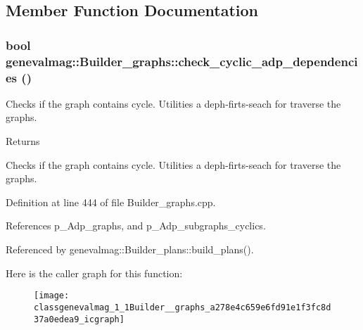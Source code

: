 \subsection{Member Function Documentation}
\hypertarget{classgenevalmag_1_1Builder__graphs_a278e4c659e6fd91e1f3fc8d37a0edea9}{
\subsubsection[{check\_\-cyclic\_\-adp\_\-dependencies}]{\setlength{\rightskip}{0pt plus 5cm}bool genevalmag::Builder\_\-graphs::check\_\-cyclic\_\-adp\_\-dependencies ()}}
\label{classgenevalmag_1_1Builder__graphs_a278e4c659e6fd91e1f3fc8d37a0edea9}
Checks if the graph contains cycle. Utilities a deph-\/firts-\/seach for traverse the graphs. \begin{DoxyReturn}{Returns}

\end{DoxyReturn}
Checks if the graph contains cycle. Utilities a deph-\/firts-\/seach for traverse the graphs. 

Definition at line 444 of file Builder\_\-graphs.cpp.



References p\_\-Adp\_\-graphs, and p\_\-Adp\_\-subgraphs\_\-cyclics.



Referenced by genevalmag::Builder\_\-plans::build\_\-plans().



Here is the caller graph for this function:\nopagebreak
\begin{figure}[H]
\begin{center}
\leavevmode
\texttt{[image: classgenevalmag\_1\_1Builder\_\_graphs\_a278e4c659e6fd91e1f3fc8d37a0edea9\_icgraph]}
\end{center}
\end{figure}



